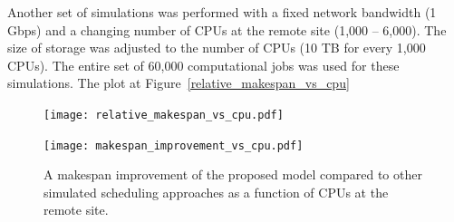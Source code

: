 \documentclass{svjour3}                     %
\begin{document}
Another set of simulations was performed with a fixed network bandwidth (1 Gbps) and a changing number of CPUs at the remote site (1,000 -- 6,000). The size of storage was adjusted to the number of CPUs (10 TB for every 1,000 CPUs). The entire set of 60,000 computational jobs was used for these simulations. The plot at Figure~\ref{relative_makespan_vs_cpu} 
%
\begin{figure}
\centering
\begin{minipage}{1\textwidth}
\centering
    \texttt{[image: relative\_makespan\_vs\_cpu.pdf]}
    \caption{A dependence of a data production makespan on the number of CPUs available at the remote node which is connected over 1 Gbps link to the central storage. %
    The makespan unit is set to 116 days, 4 hours, 16 minutes and 2 seconds which is the makespan of no\_network approach with 1,000 CPUs.}
    \label{relative_makespan_vs_cpu}
\end{minipage}\hspace{3mm}%

\begin{minipage}{1\textwidth}
\centering
    \texttt{[image: makespan\_improvement\_vs\_cpu.pdf]}
    \caption{A makespan improvement of the proposed model compared to other simulated scheduling approaches as a function of CPUs at the remote site. %
    }
    \label{makespan_improvement_vs_cpu}
\end{minipage} 
\end{figure}
%
\end{document}
